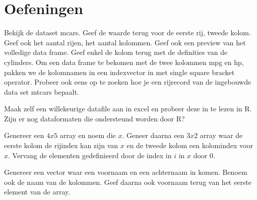 

\section{Oefeningen}
\begin{exercise}
Bekijk de dataset mcars. Geef de waarde terug voor de eerste rij, tweede kolom. Geef ook het aantal rijen, het aantal kolommen. Geef ook een preview van het volledige data frame. Geef enkel de kolom terug met de definities van de cylinders. Om een data frame te bekomen met de twee kolommen mpg en hp, pakken we de kolomnamen in een indexvector in met single square bracket operator. Probeer ook eens op te zoeken hoe je een rijrecord van de ingebouwde data set mtcars bepaalt.
\end{exercise}

\begin{exercise}
Maak zelf een willekeurige datafile aan in excel en probeer deze in te lezen in R. Zijn er nog dataformaten die ondersteund worden door R?
\end{exercise}



\begin{exercise}
	Genereer een $4x5$ array en noem die $x$. Geneer daarna een $3x2$ array waar de eerste kolom de rijindex kan zijn van $x$ en de tweede kolom een kolomindex voor $x$. Vervang de elementen gedefinieerd door de index in $i$ in $x$ door 0. 
\end{exercise}

\begin{exercise}
	Genereer een vector waar een voornaam en een achternaam in komen. Benoem ook de naam van de kolommen. Geef daarna ook voornaam terug van het eerste element van de array. 
\end{exercise}
